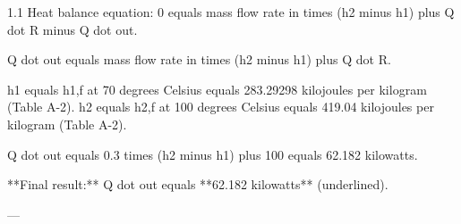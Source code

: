 1.1 Heat balance equation:  
0 equals mass flow rate in times (h2 minus h1) plus Q dot R minus Q dot out.  

Q dot out equals mass flow rate in times (h2 minus h1) plus Q dot R.  

h1 equals h1,f at 70 degrees Celsius equals 283.29298 kilojoules per kilogram (Table A-2).  
h2 equals h2,f at 100 degrees Celsius equals 419.04 kilojoules per kilogram (Table A-2).  

Q dot out equals 0.3 times (h2 minus h1) plus 100 equals 62.182 kilowatts.  

**Final result:** Q dot out equals **62.182 kilowatts** (underlined).  

---